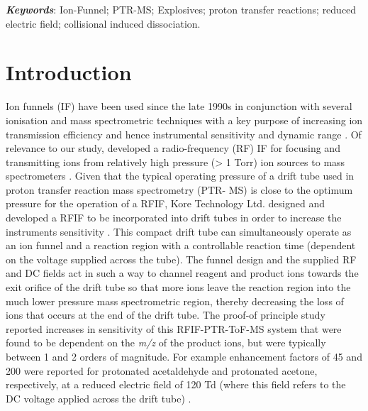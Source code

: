 \textbf{\textit{Keywords}}: Ion-Funnel; PTR-MS; Explosives; proton transfer reactions; reduced electric field; collisional induced dissociation.





\section{Introduction}

Ion funnels (IF) have been used since the late 1990s in conjunction with several ionisation and mass spectrometric techniques with a key purpose of increasing ion transmission efficiency and hence instrumental sensitivity and dynamic range \cite{shaffer1997novel,kelly2010ion}. Of relevance to our study, \citeauthor{shaffer1997novel} developed a radio-frequency (RF) IF for focusing and transmitting ions from relatively high pressure (> 1 Torr) ion sources to mass spectrometers \cite{shaffer1997novel}. Given that the typical operating pressure of a drift tube used in proton transfer reaction mass spectrometry (PTR- MS) is close to the optimum pressure for the operation of a RFIF, Kore Technology Ltd. designed and developed a RFIF to be incorporated into drift tubes in order to increase the instruments sensitivity \cite{barber2012increased}. This compact drift tube can simultaneously operate as an ion funnel and a reaction region with a controllable reaction time (dependent on the voltage supplied across the tube). The funnel design and the supplied RF and DC fields act in such a way to channel reagent and product ions towards the exit orifice of the drift tube so that more ions leave the reaction region into the much lower pressure mass spectrometric region, thereby decreasing the loss of ions that occurs at the end of the drift tube. The proof-of principle study reported increases in sensitivity of this RFIF-PTR-ToF-MS system that were found to be dependent on the \textit{m/z} of the product ions, but were typically between 1 and 2 orders of magnitude. For example enhancement factors of 45 and 200 were reported for protonated acetaldehyde and protonated acetone, respectively, at a reduced electric field of 120 Td (where this field refers to the DC voltage applied across the drift tube) \cite{barber2012increased}. 


